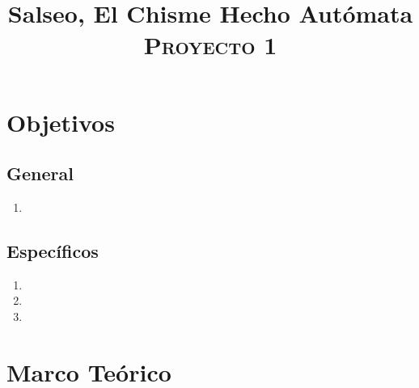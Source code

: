 \documentclass[conference]{IEEEtran}
\begin{document}
\title{Salseo, El Chisme Hecho Autómata \\
{\footnotesize \scshape{Proyecto 1}}
}

\author{
}



\maketitle

\begin{abstract}

\end{abstract}

\begin{IEEEkeywords}

\end{IEEEkeywords}

\section{Objetivos}

\subsection{General}
    \begin{enumerate}[1.]
        \item 
    \end{enumerate}
\subsection{Específicos}
    \begin{enumerate}
        \item 
        \item 
        \item 
    \end{enumerate}
    
\section{Marco Teórico}
    
\end{document}
